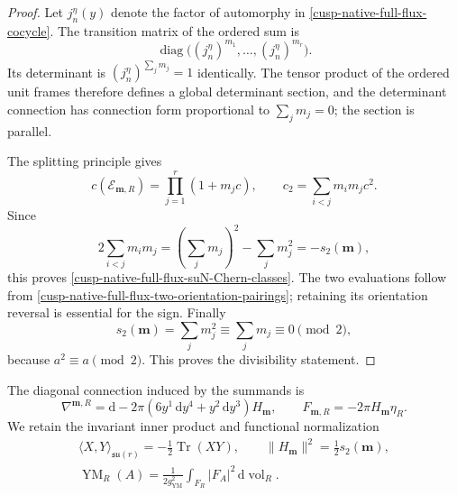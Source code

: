 \begin{proof}
Let \(j_n^\eta(y)\) denote the factor of automorphy in
\cref{cusp-native-full-flux-cocycle}.  The transition matrix of the ordered
sum is
\[
 \operatorname{diag}\bigl((j_n^\eta)^{m_1},\ldots,
 (j_n^\eta)^{m_r}\bigr).
\]
Its determinant is \((j_n^\eta)^{\sum_j m_j}=1\) identically.  The tensor
product of the ordered unit frames therefore defines a global determinant
section, and the determinant connection has connection form proportional to
\(\sum_j m_j=0\); the section is parallel.

The splitting principle gives
\[
 c(\mathscr E_{\mathbf m,R})=\prod_{j=1}^r(1+m_j c),
 \qquad
 c_2=\sum_{i<j}m_i m_j c^2.
\]
Since
\[
 2\sum_{i<j}m_i m_j
 =\left(\sum_j m_j\right)^2-\sum_j m_j^2=-s_2(\mathbf m),
\]
this proves \cref{cusp-native-full-flux-suN-Chern-classes}.  The two
evaluations follow from
\cref{cusp-native-full-flux-two-orientation-pairings}; retaining its
orientation reversal is essential for the sign.  Finally
\[
 s_2(\mathbf m)=\sum_j m_j^2\equiv\sum_j m_j\equiv0\pmod2,
\]
because \(a^2\equiv a\pmod2\).  This proves the divisibility statement.
\end{proof}

The diagonal connection induced by the summands is
\begin{equation}
 \nabla^{\mathbf m,R}
 =\mathrm d-2\pi(6y^1\,\mathrm dy^4+y^2\,\mathrm dy^3)H_{\mathbf m},
 \qquad
 F_{\mathbf m,R}=-2\pi H_{\mathbf m}\eta_R.
 \label{cusp-native-full-flux-suN-connection-curvature}
\end{equation}
We retain the invariant inner product and functional normalization
\begin{equation}
 \begin{gathered}
  \langle X,Y\rangle_{\mathfrak{su}(r)}
  =-\frac12\operatorname{Tr}(XY),
  \qquad
  \lVert H_{\mathbf m}\rVert^2=\frac12s_2(\mathbf m),\\
  \operatorname{YM}_R(A)=\frac1{2g_{\mathrm{YM}}^2}
  \int_{F_R}|F_A|^2\,\mathrm d\operatorname{vol}_R.
 \end{gathered}
 \label{cusp-native-full-flux-suN-normalizations}
\end{equation}

